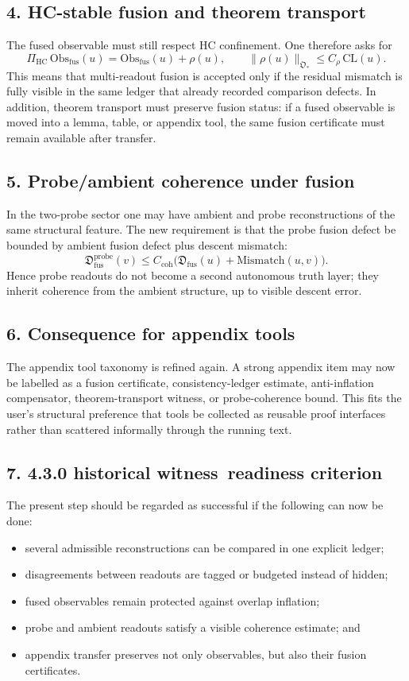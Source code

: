 \documentclass[12pt,a4paper]{article}
\newcommand{\docversion}{4.3.0 historical witness}
\begin{document}
\subsection*{4. HC-stable fusion and theorem transport}
The fused observable must still respect HC confinement. One therefore asks for
\[
\Pi_{\mathrm{HC}}\,\mathrm{Obs}_{\mathrm{fus}}(u)
=\mathrm{Obs}_{\mathrm{fus}}(u)+\rho(u),
\qquad
\|\rho(u)\|_{\mathfrak O_*}
\le C_{\rho}\,\mathrm{CL}(u).
\]
This means that multi-readout fusion is accepted only if the residual mismatch is
fully visible in the same ledger that already recorded comparison defects. In
addition, theorem transport must preserve fusion status: if a fused observable is
moved into a lemma, table, or appendix tool, the same fusion certificate must
remain available after transfer.

\subsection*{5. Probe/ambient coherence under fusion}
In the two-probe sector one may have ambient and probe reconstructions of the same
structural feature. The new requirement is that the probe fusion defect be bounded
by ambient fusion defect plus descent mismatch:
\[
\mathfrak D^{\mathrm{probe}}_{\mathrm{fus}}(v)
\le C_{\mathrm{coh}}
\bigl(
\mathfrak D_{\mathrm{fus}}(u)+\mathrm{Mismatch}(u,v)
\bigr).
\]
Hence probe readouts do not become a second autonomous truth layer; they inherit
coherence from the ambient structure, up to visible descent error.

\subsection*{6. Consequence for appendix tools}
The appendix tool taxonomy is refined again. A strong appendix item may now be
labelled as a fusion certificate, consistency-ledger estimate, anti-inflation
compensator, theorem-transport witness, or probe-coherence bound. This fits the
user's structural preference that tools be collected as reusable proof interfaces
rather than scattered informally through the running text.

\subsection*{7. \docversion\ readiness criterion}
The present step should be regarded as successful if the following can now be
done:
\begin{itemize}
 \item several admissible reconstructions can be compared in one explicit ledger;
 \item disagreements between readouts are tagged or budgeted instead of hidden;
 \item fused observables remain protected against overlap inflation;
 \item probe and ambient readouts satisfy a visible coherence estimate; and
 \item appendix transfer preserves not only observables, but also their fusion certificates.
\end{itemize}
\end{document}
